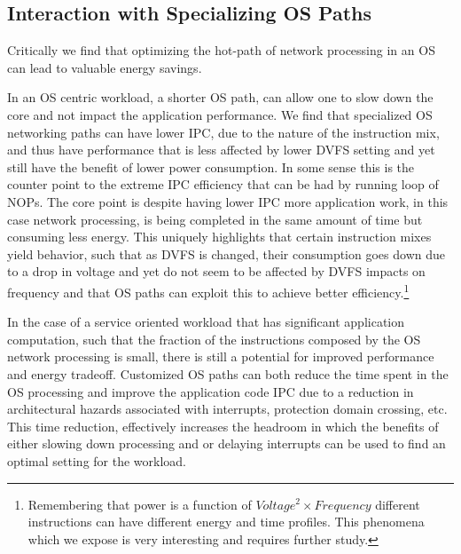 \subsection{Interaction with Specializing OS Paths} 
 Critically we find that optimizing the hot-path of network processing in an OS can lead to valuable energy savings.  

In an OS centric workload, a shorter OS path, can allow one to slow down the core and not impact the application performance.  We find that specialized OS networking paths can have lower IPC, due to the nature of the instruction mix, and thus have performance that is less affected by lower DVFS setting and yet still have the benefit of lower power consumption.  In some sense this is the counter point to the extreme IPC efficiency that can be had by running loop of NOPs.    The core point is despite having lower IPC more application work, in this case network processing, is being completed in the same amount of time but consuming less energy.  This uniquely highlights that certain instruction mixes yield behavior, such that as DVFS is changed, their consumption goes down due to a drop in voltage and yet do not seem to be affected by DVFS impacts on frequency and that OS paths can exploit this to achieve better efficiency.\footnote{Remembering that power is a function of $Voltage^2 \times Frequency$ different instructions can have different energy and time profiles.  This phenomena which we expose is very interesting and requires further study.}

In the case of a service oriented workload that has significant application computation, such that the fraction of the instructions composed by the OS network processing is small, there is still a potential for improved performance and energy tradeoff.  Customized OS paths can both reduce the time spent in the OS processing and improve the application code IPC due to a reduction in architectural hazards associated with interrupts, protection domain crossing, etc.  This time reduction, effectively increases the headroom in which the benefits of either slowing down processing and or delaying interrupts can be used to find an optimal setting for the workload. 
 
